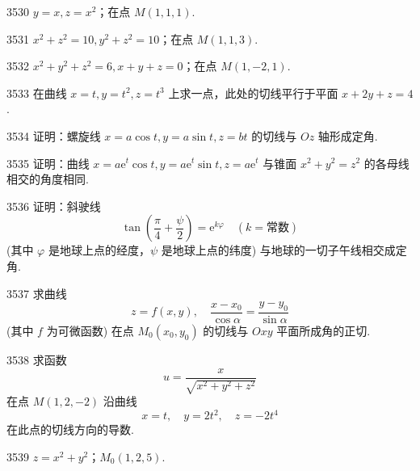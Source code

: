\begin{prob}[S]{3530}
$y = x, z = x^2$；在点 $M(1, 1, 1)$.
\end{prob}

\begin{prob}[S]{3531}
$x^2 + z^2 = 10, y^2 + z^2 = 10$；在点 $M(1, 1, 3)$.
\end{prob}

\begin{prob}[S]{3532}
$x^2 + y^2 + z^2 = 6, x + y + z = 0$；在点 $M(1, -2, 1)$.
\end{prob}

\begin{prob}[M]{3533}
在曲线 $x = t, y = t^2, z = t^3$ 上求一点，此处的切线平行于平面 $x + 2y + z = 4$.
\end{prob}

\begin{prob}[M]{3534}
证明：螺旋线 $x = a\cos t, y = a\sin t, z = bt$ 的切线与 $Oz$ 轴形成定角.
\end{prob}

\begin{prob}[M]{3535}
证明：曲线 $x = a\mathrm{e}^t\cos t, y = a\mathrm{e}^t\sin t, z = a\mathrm{e}^t$ 与锥面 $x^2 + y^2 = z^2$ 的各母线相交的角度相同.
\end{prob}

\begin{prob}[M]{3536}
证明：斜驶线
\[
\tan\left(\frac{\pi}{4} + \frac{\psi}{2}\right) = \mathrm{e}^{k\varphi} \quad (k = \text{常数})
\]
(其中 $\varphi$ 是地球上点的经度，$\psi$ 是地球上点的纬度) 与地球的一切子午线相交成定角.
\end{prob}

\begin{prob}[M]{3537}
求曲线
\[
z = f(x, y), \quad \frac{x - x_0}{\cos\alpha} = \frac{y - y_0}{\sin\alpha}
\]
(其中 $f$ 为可微函数) 在点 $M_0(x_0, y_0)$ 的切线与 $Oxy$ 平面所成角的正切.
\end{prob}

\begin{prob}[M]{3538}
求函数
\[
u = \frac{x}{\sqrt{x^2 + y^2 + z^2}}
\]
在点 $M(1, 2, -2)$ 沿曲线
\[
x = t, \quad y = 2t^2, \quad z = -2t^4
\]
在此点的切线方向的导数.
\end{prob}


\begin{prob}[S]{3539}
$z = x^2 + y^2$；$M_0(1, 2, 5)$.
\end{prob}

